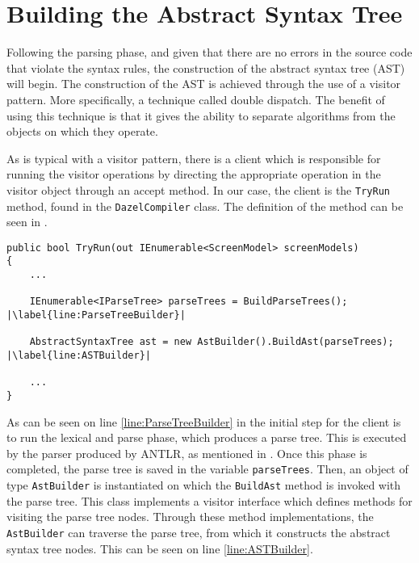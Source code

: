 \section{Building the Abstract Syntax Tree} \label{sec:buildASTSection}

Following the parsing phase, and given that there are no errors in the source code that violate the syntax rules, the construction of the abstract syntax tree (AST) will begin. The construction of the AST is achieved through the use of a visitor pattern. More specifically, a technique called double dispatch. The benefit of using this technique is that it gives the ability to separate algorithms from the objects on which they operate\cite{VisitorGuru}. 

As is typical with a visitor pattern, there is a client which is responsible for running the visitor operations by directing the appropriate operation in the visitor object through an accept method. In our case, the client is the \texttt{TryRun} method, found in the \texttt{DazelCompiler} class. The definition of the method can be seen in .

\begin{lstlisting}[language=CSharp, caption={The \texttt{TryRun} method that serves as a client inside the \texttt{DazelCompiler} class.}, label={lst:RunMethod},escapechar=|]
public bool TryRun(out IEnumerable<ScreenModel> screenModels)
{
    ...

    IEnumerable<IParseTree> parseTrees = BuildParseTrees(); |\label{line:ParseTreeBuilder}|

    AbstractSyntaxTree ast = new AstBuilder().BuildAst(parseTrees); |\label{line:ASTBuilder}|

    ...
}
\end{lstlisting}

As can be seen on line \ref{line:ParseTreeBuilder} in  the initial step for the client is to run the lexical and parse phase, which produces a parse tree. This is executed by the parser produced by ANTLR, as mentioned in . Once this phase is completed, the parse tree is saved in the variable \texttt{parseTrees}. Then, an object of type \texttt{AstBuilder} is instantiated on which the \texttt{BuildAst} method is invoked with the parse tree. This class implements a visitor interface which defines methods for visiting the parse tree nodes. Through these method implementations, the \texttt{AstBuilder} can traverse the parse tree, from which it constructs the abstract syntax tree nodes. This can be seen on line \ref{line:ASTBuilder}. 

